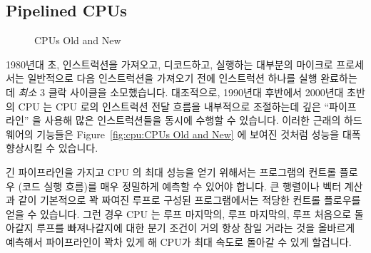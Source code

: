 \subsection{Pipelined CPUs}
\label{sec:cpu:Pipelined CPUs}

\begin{figure}[tb]
\centering
{}
\caption{CPUs Old and New}
\end{figure}

1980년대 초, 인스트럭션을 가져오고, 디코드하고, 실행하는 대부분의 마이크로
프로세서는 일반적으로 다음 인스트럭션을 가져오기 전에 인스트럭션 하나를 실행
완료하는데 \emph{최소} 3 클락 사이클을 소모했습니다.
대조적으로, 1990년대 후반에서 2000년대 초반의 CPU 는 CPU 로의 인스트럭션 전달
흐름을 내부적으로 조절하는데 깊은 ``파이프라인'' 을 사용해 많은 인스트럭션들을
동시에 수행할 수 있습니다.
이러한 근래의 하드웨어의 기능들은 Figure~\ref{fig:cpu:CPUs Old and New} 에
보여진 것처럼 성능을 대폭 향상시킬 수 있습니다.

긴 파이프라인을 가지고 CPU 의 최대 성능을 얻기 위해서는 프로그램의 컨트롤
플로우 (코드 실행 흐름)를 매우 정밀하게 예측할 수 있어야 합니다.
큰 행렬이나 벡터 계산과 같이 기본적으로 꽉 짜여진 루프로 구성된 프로그램에서는
적당한 컨트롤 플로우를 얻을 수 있습니다.
그런 경우 CPU 는 루프 마지막의, 루프 마지막의, 루프 처음으로 돌아갈지 루프를
빠져나갈지에 대한 분기  조건이 거의 항상 참일 거라는 것을 올바르게 예측해서
파이프라인이 꽉차 있게 해 CPU가 최대 속도로 돌아갈 수 있게 할겁니다.

